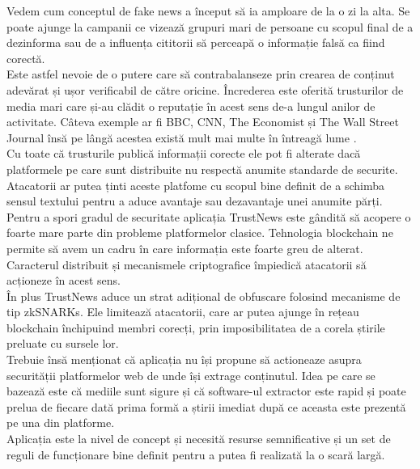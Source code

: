 Vedem cum conceptul de fake news a început să ia amploare de la o zi la alta. Se poate ajunge la campanii ce vizează grupuri mari de persoane cu scopul final de a dezinforma sau de a influența cititorii să perceapă o informație falsă ca fiind corectă.\\

Este astfel nevoie de o putere care să contrabalanseze prin crearea de conținut adevărat și ușor verificabil de către oricine. Încrederea este oferită trusturilor de media mari care și-au clădit o reputație în acest sens de-a lungul anilor de activitate.
Câteva exemple ar fi BBC, CNN, The Economist și The Wall Street Journal însă pe lângă acestea există mult mai multe în întreagă lume \cite{FakeNews_TrustedSites}.\\

Cu toate că trusturile publică informații corecte ele pot fi alterate dacă platformele pe care sunt distribuite nu respectă anumite standarde de securite. Atacatorii ar putea ținti aceste platfome cu scopul bine definit de a schimba sensul textului pentru a aduce avantaje sau dezavantaje unei anumite părți.\\

Pentru a spori gradul de securitate aplicația TrustNews este gândită să acopere o foarte mare parte din probleme platformelor clasice. Tehnologia blockchain ne permite să avem un cadru în care informația este foarte greu de alterat. Caracterul distribuit și mecanismele criptografice împiedică atacatorii să acționeze în acest sens.\\

În plus TrustNews aduce un strat adițional de obfuscare folosind mecanisme de tip zkSNARKs. Ele limitează atacatorii, care ar putea ajunge în rețeau blockchain închipuind membri corecți, prin imposibilitatea de a corela știrile preluate cu sursele lor.\\

Trebuie însă menționat că aplicația nu își propune să actioneaze asupra securității platformelor web de unde își extrage conținutul. Idea pe care se bazează este că mediile sunt sigure și că software-ul extractor este rapid și poate prelua de fiecare dată prima formă a știrii imediat după ce aceasta este prezentă pe una din platforme.\\

Aplicația este la nivel de concept și necesită resurse semnificative și un set de reguli de funcționare bine definit pentru a putea fi realizată la o scară largă.\\